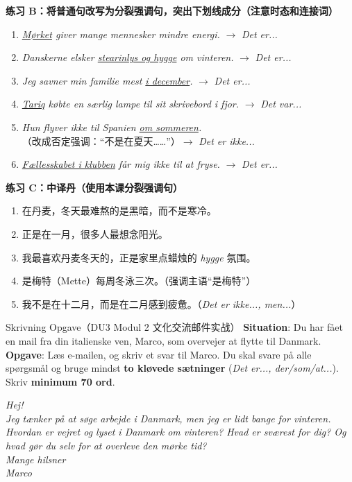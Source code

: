 \textbf{练习 B：将普通句改写为分裂强调句，突出下划线成分（注意时态和连接词）}
\begin{enumerate}
  \item \textit{\underline{Mørket} giver mange mennesker mindre energi.} $\rightarrow$ \textit{Det er...}
  \item \textit{Danskerne elsker \underline{stearinlys og hygge} om vinteren.} $\rightarrow$ \textit{Det er...}
  \item \textit{Jeg savner min familie mest \underline{i december}.} $\rightarrow$ \textit{Det er...}
  \item \textit{\underline{Tariq} købte en særlig lampe til sit skrivebord i fjor.} $\rightarrow$ \textit{Det var...}
  \item \textit{Hun flyver ikke til Spanien \underline{om sommeren}.}（改成否定强调：“不是在夏天……”）$\rightarrow$ \textit{Det er ikke...}
  \item \textit{\underline{Fællesskabet i klubben} får mig ikke til at fryse.} $\rightarrow$ \textit{Det er...}
\end{enumerate}

\textbf{练习 C：中译丹（使用本课分裂强调句）}
\begin{enumerate}
  \item 在丹麦，冬天最难熬的是黑暗，而不是寒冷。
  \item 正是在一月，很多人最想念阳光。
  \item 我最喜欢丹麦冬天的，正是家里点蜡烛的 \textit{hygge} 氛围。
  \item 是梅特（Mette）每周冬泳三次。（强调主语“是梅特”）
  \item 我不是在十二月，而是在二月感到疲惫。（\textit{Det er ikke..., men...}）
\end{enumerate}


\begin{emailbox}{Skrivning Opgave（DU3 Modul 2 文化交流邮件实战）}
\textbf{Situation}: Du har fået en mail fra din italienske ven, Marco, som overvejer at flytte til Danmark.\\
\textbf{Opgave}: Læs e-mailen, og skriv et svar til Marco. Du skal svare på alle spørgsmål og bruge mindst \textbf{to kløvede sætninger} (\textit{Det er..., der/som/at...}). Skriv \textbf{minimum 70 ord}.

\vspace{0.3em}
\textit{Hej!\\
Jeg tænker på at søge arbejde i Danmark, men jeg er lidt bange for vinteren. Hvordan er vejret og lyset i Danmark om vinteren? Hvad er sværest for dig? Og hvad gør du selv for at overleve den mørke tid?\\
Mange hilsner\\
Marco}
\end{emailbox}


